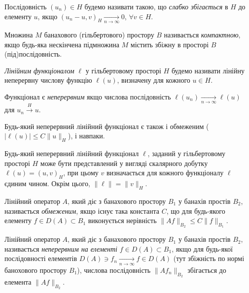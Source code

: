\begin{definition}
    Послідовність $(u_n) \in H$ будемо називати такою, що \emph{слабко збігається} в $H$ до елементу $u$, якщо $(u_n - u, v)_H \xrightarrow[n \to \infty]{} 0$, $\forall v \in H$. 
\end{definition}

\begin{definition}
    Множина $M$ банахового (гільбертового) простору $B$ називається \emph{компактною}, якщо будь-яка нескінчена підмножина $M$ містить збіжну в просторі $B$ (під)послідовність.
\end{definition}

\begin{definition}
    \emph{Лінійним функціоналом} $\ell$ у гільбертовому просторі $H$ будемо називати лінійну неперервну числову функцію $\ell(u)$, визначену для кожного $u \in H$.
\end{definition}

\begin{definition}
    Функціонал є \emph{неперервним} якщо числова послідовність $\ell(u_n) \xrightarrow[n \to \infty]{} \ell(u)$ для $u_n \xrightarrow{H} u$.
\end{definition}

\begin{proposition}
    Будь-який неперервний лінійний функціонал є також і обмеженим ($|\ell(u)| \le C \|u\|_H$), і навпаки.
\end{proposition}

\begin{theorem}
    Будь-який неперервний лінійний функціонал $\ell$, заданий у гільбертовому просторі $H$ може бути представлений у вигляді скалярного добутку $\ell(u) = (u,v)_H$, при цьому $v$ визначається для кожного функціоналу $\ell$ єдиним чином. Окрім цього, $\|\ell\| = \|v\|_H$.
\end{theorem}

\begin{definition}
    Лінійний оператор $A$, який діє з банахового простору $B_1$ у банахів простів $B_2$, називається \emph{обмеженим}, якщо існує така константа $C$, що для будь-якого елементу $f \in D(A) \subset B_1$ виконується нерівність $\|A f\|_{B_2} \le C \|f\|_{B_1}$.
\end{definition}

\begin{definition}
    Лінійний оператор $A$, який діє з банахового простору $B_1$ у банахів простів $B_2$, називається \emph{неперервним на елементі} $f \in D(A) \subset B_1$, якщо для будь-якої послідовності елементів $D(A) \ni f_n \xrightarrow[n \to \infty]{} f \in D(A)$ (тут збіжність по нормі банохового простору $B_1$), числова послідовність $\|Af_n\|_{B_2}$ збігається до елемента $\|Af\|_{B_2}$.
\end{definition}

